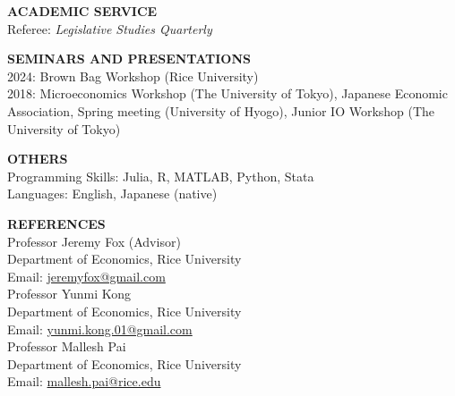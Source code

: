 \documentclass[10pt]{article}
\begin{document}
\vspace{10pt}

\textbf{ACADEMIC SERVICE} \\
Referee: \textit{Legislative Studies Quarterly}

\vspace{10pt}

\textbf{SEMINARS AND PRESENTATIONS} \\
2024: Brown Bag Workshop (Rice University) \\
2018: Microeconomics Workshop (The University of Tokyo), Japanese Economic Association, Spring meeting (University of Hyogo), Junior IO Workshop (The University of Tokyo)

\vspace{10pt}

\textbf{OTHERS} \\
Programming Skills: Julia, R, MATLAB, Python, Stata \\
Languages: English, Japanese (native)

\vspace{10pt}

\textbf{REFERENCES} \\
Professor Jeremy Fox (Advisor) \\
Department of Economics, Rice University \\
Email: \href{mailto:jeremyfox@gmail.com}{jeremyfox@gmail.com} \\

Professor Yunmi Kong \\
Department of Economics, Rice University \\
Email: \href{mailto:yunmi.kong.01@gmail.com}{yunmi.kong.01@gmail.com} \\

Professor Mallesh Pai \\
Department of Economics, Rice University \\
Email: \href{mailto:mallesh.pai@rice.edu}{mallesh.pai@rice.edu}
\end{document}

